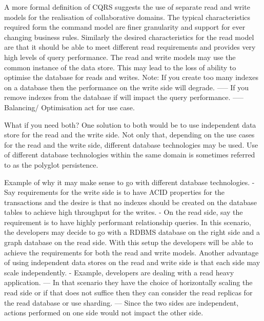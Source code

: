 \documentclass[a4paper, 11pt]{book}
\begin{document}
    A more formal definition of CQRS suggests the use of separate read and write models for the realisation of collaborative domains.
    The typical characteristics required form the command model are finer granularity and support for ever changing business rules.
    Similarly the desired characteristics for the read model are that it should be able to meet different read requirements and provides very high levels of query performance.
    The read and write models may use the common instance of the data store.
    This may lead to the loss of ability to optimise the database for reads and writes.
    Note: If you create too many indexes on a database then the performance on the write side will degrade.
    ----- If you remove indexes from the database if will impact the query performance.
    ----- Balancing/ Optimisation act for use case.

    What if you need both?
    One solution to both would be to use independent data store for the read and the write side.
    Not only that, depending on the use cases for the read and the write side, different database technologies may be used.
    Use of different database technologies within the same domain is sometimes referred to as the polyglot persistence.

    Example of why it may make sense to go with different database technologies.
    - Say requirements for the write side is to have ACID properties for the transactions and the desire is that no indexes should be created on the database tables to achieve high throughput for the writes.
    - On the read side, say the requirement is to have highly performant relationship queries.
    In this scenario, the developers may decide to go with a RDBMS database on the right side and a graph database on the read side.
    With this setup the developers will be able to achieve the requirements for both the read and write models.
    Another advantage of using independent data stores on the read and write side is that each side may scale independently.
    - Example, developers are dealing with a read heavy application.
    --- In that scenario they have the choice of horizontally scaling the read side or if that does not suffice then they can consider the read replicas for the read database or use sharding.
    --- Since the two sides are independent, actions performed on one side would not impact the other side.
\end{document}
